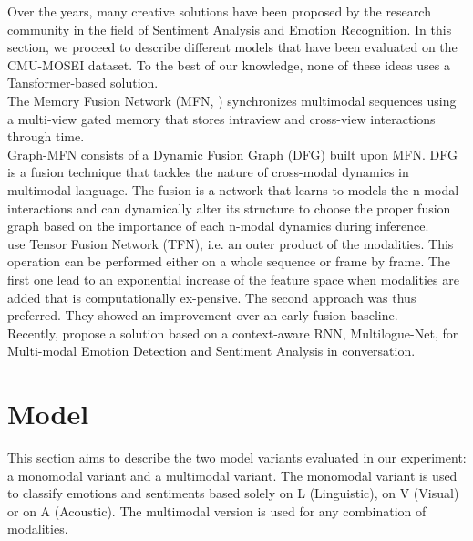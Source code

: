 \documentclass[11pt,a4paper]{article}
\begin{document}
Over the years, many creative solutions have been proposed by the research community in the field of Sentiment Analysis and Emotion Recognition. In this section, we proceed to describe different models that have been evaluated on the CMU-MOSEI dataset. To the best of our knowledge, none of these ideas uses a Tansformer-based solution. \\

The Memory Fusion Network (MFN, \citet{zadeh2018memory}) synchronizes multimodal sequences
using a multi-view gated memory that stores intraview and cross-view interactions through time. \\

Graph-MFN \cite{bagher-zadeh-etal-2018-multimodal} consists of a Dynamic Fusion Graph (DFG) built upon MFN. DFG is a fusion technique that tackles the nature of cross-modal dynamics in multimodal language. The fusion is a network that learns to models the n-modal interactions and can dynamically alter its structure to choose the proper fusion graph based on the importance of each n-modal dynamics during inference. \\

\citet{sahay-etal-2018-multimodal} use Tensor Fusion Network (TFN), i.e.  an outer product of the modalities. This operation can be performed either on a whole sequence or frame by frame. The first one lead to an exponential increase of the feature space when modalities are added that is computationally ex-pensive. The second approach was thus preferred. They showed an improvement over an early fusion baseline. \\

Recently, \citet{shenoy2020multiloguenet} propose a solution based on a context-aware RNN, Multilogue-Net, for Multi-modal Emotion Detection and Sentiment Analysis in conversation.






















\section{Model}
\label{sec:model}
This section aims to describe the two model variants evaluated in our experiment: a monomodal variant and a multimodal variant. The monomodal variant is used to classify emotions and sentiments based solely on L (Linguistic), on V (Visual) or on A (Acoustic). The multimodal version is used for any combination of modalities. \\
\end{document}
